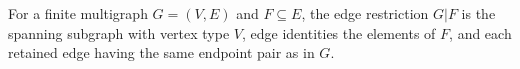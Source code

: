 \begin{definition}
For a finite multigraph $G=(V,E)$ and $F\subseteq E$, the edge restriction
$G|F$ is the spanning subgraph with vertex type $V$, edge identities the
elements of $F$, and each retained edge having the same endpoint pair as in
$G$.
\end{definition}
